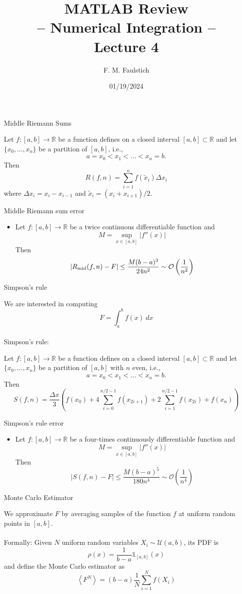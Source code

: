 \documentclass{beamer}
\title{
MATLAB Review\\
-- Numerical Integration --\\
Lecture 4
}
\author{F. M. Faulstich}
\date{01/19/2024}
\newcommand{\bitem}{\item[$\bullet$]}
\begin{document}
\frame{\titlepage}

\begin{frame}{Middle Riemann Sums}

Let $f:[a,b] \to \mathbb{R}$ be a function defines on a closed interval $[a,b]\subset \mathbb{R}$ and let $\{x_0,...,x_n\}$ be a partition of $[a,b]$, i.e.,
$$
a = x_0 <x_1 <...<x_n = b.
$$
Then
$$
R(f,n)
=
\sum_{i=1}^{n} f(\tilde{x}_{i}) \Delta x_i
$$
where $\Delta x_i = x_i - x_{i-1}$ and $\tilde{x}_i = (x_i + x_{i+1})/2$.
    
\end{frame}

\begin{frame}{Middle Riemann sum error}

\begin{itemize}
    \bitem Let $f:[a,b] \to \mathbb{R}$ be a twice continuous differentiable function and 
    $$
    M = \sup_{x\in [a,b]} |f''(x)|
    $$
    Then
    $$
    |R_{\rm mid}(f,n) - F| \leq \frac{M (b-a)^3}{24n^2} \sim \mathcal{O}\left( \frac{1}{n^2}\right)
    $$
\end{itemize}

\end{frame}


\begin{frame}{Simpson's rule}

We are interested in computing
$$
F=\int_a^b f(x)~dx
$$
~\\
Simpson's rule:

Let $f:[a,b] \to \mathbb{R}$ be a function defines on a closed interval $[a,b]\subset \mathbb{R}$ and let $\{x_0,...,x_n\}$ be a partition of $[a,b]$ with $n$ even, i.e.,
$$
a = x_0 <x_1 <...<x_n = b.
$$
Then
$$
S(f,n)
=
\frac{\Delta x}{3}
\left(
f(x_0) + 
4 \sum_{i = 0}^{n/2-1} f(x_{2i+1}) + 
2\sum_{i = 1}^{n/2-1} f(x_{2i}) + 
f(x_n)
\right)
$$

    
\end{frame}


\begin{frame}{Simpson's rule error}

\begin{itemize}
    \bitem Let $f:[a,b] \to \mathbb{R}$ be a four-times continuously differentiable function and 
    $$
    M = \sup_{x\in [a,b]} |f''(x)|
    $$
    Then
    $$
    |S(f,n) - F| \leq \frac{M (b-a)^5}{180 n^4} \sim \mathcal{O}\left( \frac{1}{n^4}\right)
    $$
\end{itemize}
    
\end{frame}



\begin{frame}{Monte Carlo Estimator}

We approximate $F$ by averaging samples of the function $f$ at uniform random points in $[a,b]$. \\
~\\
Formally: Given $N$ uniform random variables $X_i \sim \mathcal{U}(a,b)$, its PDF is 
$$
\rho(x)
=
\frac{1}{b-a}\mathds{1}_{[a,b]}(x)
$$
and define the Monte Carlo estimator as
$$
\left\langle
F^N
\right\rangle
=
(b-a) \frac{1}{N} \sum_{i=1}^{N} f(X_i)
$$

\end{frame}
\end{document}
